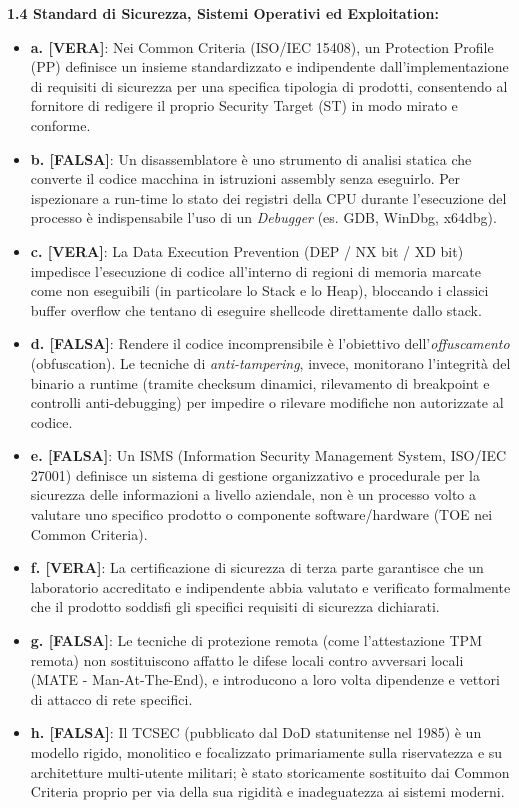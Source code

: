 \documentclass[11pt,a4paper]{article}
\begin{document}
\begin{solutionbox}
\textbf{1.4 Standard di Sicurezza, Sistemi Operativi ed Exploitation:}
\begin{itemize}
    \item \textbf{a. [VERA]}: Nei Common Criteria (ISO/IEC 15408), un Protection Profile (PP) definisce un insieme standardizzato e indipendente dall'implementazione di requisiti di sicurezza per una specifica tipologia di prodotti, consentendo al fornitore di redigere il proprio Security Target (ST) in modo mirato e conforme.
    \item \textbf{b. [FALSA]}: Un disassemblatore è uno strumento di analisi statica che converte il codice macchina in istruzioni assembly senza eseguirlo. Per ispezionare a run-time lo stato dei registri della CPU durante l'esecuzione del processo è indispensabile l'uso di un \textit{Debugger} (es. GDB, WinDbg, x64dbg).
    \item \textbf{c. [VERA]}: La Data Execution Prevention (DEP / NX bit / XD bit) impedisce l'esecuzione di codice all'interno di regioni di memoria marcate come non eseguibili (in particolare lo Stack e lo Heap), bloccando i classici buffer overflow che tentano di eseguire shellcode direttamente dallo stack.
    \item \textbf{d. [FALSA]}: Rendere il codice incomprensibile è l'obiettivo dell'\textit{offuscamento} (obfuscation). Le tecniche di \textit{anti-tampering}, invece, monitorano l'integrità del binario a runtime (tramite checksum dinamici, rilevamento di breakpoint e controlli anti-debugging) per impedire o rilevare modifiche non autorizzate al codice.
    \item \textbf{e. [FALSA]}: Un ISMS (Information Security Management System, ISO/IEC 27001) definisce un sistema di gestione organizzativo e procedurale per la sicurezza delle informazioni a livello aziendale, non è un processo volto a valutare uno specifico prodotto o componente software/hardware (TOE nei Common Criteria).
    \item \textbf{f. [VERA]}: La certificazione di sicurezza di terza parte garantisce che un laboratorio accreditato e indipendente abbia valutato e verificato formalmente che il prodotto soddisfi gli specifici requisiti di sicurezza dichiarati.
    \item \textbf{g. [FALSA]}: Le tecniche di protezione remota (come l'attestazione TPM remota) non sostituiscono affatto le difese locali contro avversari locali (MATE - Man-At-The-End), e introducono a loro volta dipendenze e vettori di attacco di rete specifici.
    \item \textbf{h. [FALSA]}: Il TCSEC (pubblicato dal DoD statunitense nel 1985) è un modello rigido, monolitico e focalizzato primariamente sulla riservatezza e su architetture multi-utente militari; è stato storicamente sostituito dai Common Criteria proprio per via della sua rigidità e inadeguatezza ai sistemi moderni.

\end{itemize}
\end{solutionbox}
\end{document}
